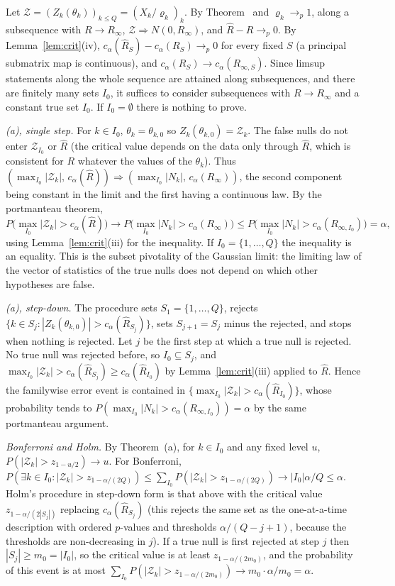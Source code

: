 Let $\mathcal Z=(Z_k(\theta_k))_{k\le Q}=(X_k/\varrho_k)_k$. By Theorem~ and $\varrho_k\to_p1$, along a subsequence with $R\to R_\infty$, $\mathcal Z\Rightarrow N(0,R_\infty)$, and $\hat R-R\to_p0$. By Lemma~\ref{lem:crit}(iv), $c_\alpha(\hat R_S)-c_\alpha(R_S)\to_p0$ for every fixed $S$ (a principal submatrix map is continuous), and $c_\alpha(R_S)\to c_\alpha(R_{\infty,S})$. Since limsup statements along the whole sequence are attained along subsequences, and there are finitely many sets $I_0$, it suffices to consider subsequences with $R\to R_\infty$ and a constant true set $I_0$. If $I_0=\emptyset$ there is nothing to prove.

\emph{(a), single step.} For $k\in I_0$, $\theta_k=\theta_{k,0}$ so $Z_k(\theta_{k,0})=\mathcal Z_k$. The false nulls do not enter $\mathcal Z_{I_0}$ or $\hat R$ (the critical value depends on the data only through $\hat R$, which is consistent for $R$ whatever the values of the $\theta_k$). Thus $(\max_{I_0}|\mathcal Z_k|,\,c_\alpha(\hat R))\Rightarrow(\max_{I_0}|N_k|,\,c_\alpha(R_\infty))$, the second component being constant in the limit and the first having a continuous law. By the portmanteau theorem,
\[
P\big(\max_{I_0}|\mathcal Z_k|>c_\alpha(\hat R)\big)\to P\big(\max_{I_0}|N_k|>c_\alpha(R_\infty)\big)\le P\big(\max_{I_0}|N_k|>c_\alpha(R_{\infty,I_0})\big)=\alpha,
\]
using Lemma~\ref{lem:crit}(iii) for the inequality. If $I_0=\{1,\dots,Q\}$ the inequality is an equality. This is the subset pivotality of the Gaussian limit: the limiting law of the vector of statistics of the true nulls does not depend on which other hypotheses are false.

\emph{(a), step-down.} The procedure sets $S_1=\{1,\dots,Q\}$, rejects $\{k\in S_j:|Z_k(\theta_{k,0})|>c_\alpha(\hat R_{S_j})\}$, sets $S_{j+1}=S_j$ minus the rejected, and stops when nothing is rejected. Let $j$ be the first step at which a true null is rejected. No true null was rejected before, so $I_0\subseteq S_j$, and $\max_{I_0}|\mathcal Z_k|>c_\alpha(\hat R_{S_j})\ge c_\alpha(\hat R_{I_0})$ by Lemma~\ref{lem:crit}(iii) applied to $\hat R$. Hence the familywise error event is contained in $\{\max_{I_0}|\mathcal Z_k|>c_\alpha(\hat R_{I_0})\}$, whose probability tends to $P(\max_{I_0}|N_k|>c_\alpha(R_{\infty,I_0}))=\alpha$ by the same portmanteau argument.

\emph{Bonferroni and Holm.} By Theorem~(a), for $k\in I_0$ and any fixed level $u$, $P(|\mathcal Z_k|>z_{1-u/2})\to u$. For Bonferroni, $P(\exists k\in I_0:|\mathcal Z_k|>z_{1-\alpha/(2Q)})\le\sum_{I_0}P(|\mathcal Z_k|>z_{1-\alpha/(2Q)})\to|I_0|\alpha/Q\le\alpha$. Holm's procedure in step-down form is that above with the critical value $z_{1-\alpha/(2|S_j|)}$ replacing $c_\alpha(\hat R_{S_j})$ (this rejects the same set as the one-at-a-time description with ordered $p$-values and thresholds $\alpha/(Q-j+1)$, because the thresholds are non-decreasing in $j$). If a true null is first rejected at step $j$ then $|S_j|\ge m_0=|I_0|$, so the critical value is at least $z_{1-\alpha/(2m_0)}$, and the probability of this event is at most $\sum_{I_0}P(|\mathcal Z_k|>z_{1-\alpha/(2m_0)})\to m_0\cdot\alpha/m_0=\alpha$.

